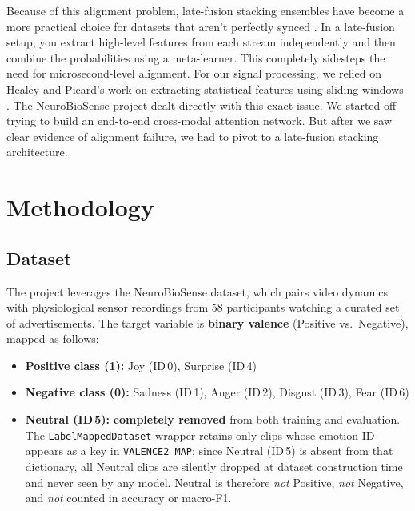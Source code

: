 \documentclass[12pt, a4paper]{article}
\begin{document}
Because of this alignment problem, late-fusion stacking ensembles have become a more practical choice for datasets that aren't perfectly synced \cite{ref_new3}. In a late-fusion setup, you extract high-level features from each stream independently and then combine the probabilities using a meta-learner. This completely sidesteps the need for microsecond-level alignment. For our signal processing, we relied on Healey and Picard's work on extracting statistical features using sliding windows \cite{ref_new4}. The NeuroBioSense project dealt directly with this exact issue. We started off trying to build an end-to-end cross-modal attention network. But after we saw clear evidence of alignment failure, we had to pivot to a late-fusion stacking architecture.

\section{Methodology}

\subsection{Dataset}

The project leverages the NeuroBioSense dataset, which pairs video dynamics with physiological sensor recordings from 58 participants watching a curated set of advertisements. The target variable is \textbf{binary valence} (Positive vs.\ Negative), mapped as follows:

\begin{itemize}
    \item \textbf{Positive class (1):} Joy (ID\,0), Surprise (ID\,4)
    \item \textbf{Negative class (0):} Sadness (ID\,1), Anger (ID\,2), Disgust (ID\,3), Fear (ID\,6)
    \item \textbf{Neutral (ID\,5):} \textbf{completely removed} from both training and evaluation. The \texttt{LabelMappedDataset} wrapper retains only clips whose emotion ID appears as a key in \texttt{VALENCE2\_MAP}; since Neutral (ID\,5) is absent from that dictionary, all Neutral clips are silently dropped at dataset construction time and never seen by any model. Neutral is therefore \emph{not} Positive, \emph{not} Negative, and \emph{not} counted in accuracy or macro-F1.
\end{itemize}
\end{document}
